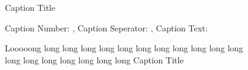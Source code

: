 \documentclass{article}
\begin{document}
\begin{figure}[ht]
  \centering
  
  \caption{Caption Title}
    
  \caption{Looooong long long long long long long long long long long long long long long long long long long Caption Title}
  
  Caption Number: , 
  Caption Seperator: ,
  Caption Text: 
\end{figure}
\end{document}

